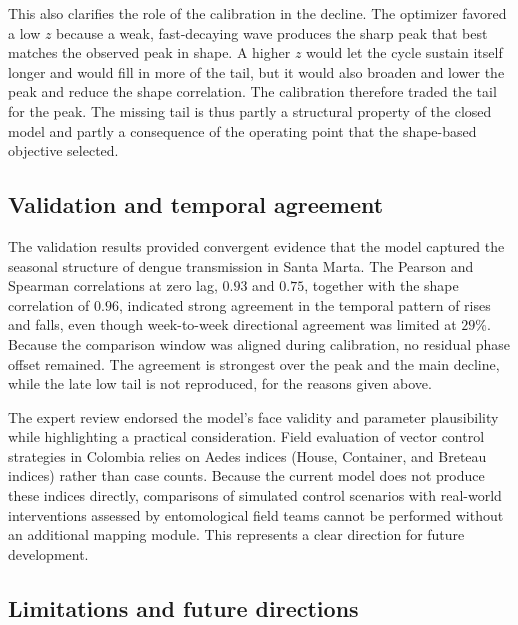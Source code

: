 \documentclass[applsci,article,accept,pdftex,moreauthors]{Definitions/mdpi}
\begin{document}
This also clarifies the role of the calibration in the decline. The optimizer favored a low $z$ because a weak, fast-decaying wave produces the sharp peak that best matches the observed peak in shape. A higher $z$ would let the cycle sustain itself longer and would fill in more of the tail, but it would also broaden and lower the peak and reduce the shape correlation. The calibration therefore traded the tail for the peak. The missing tail is thus partly a structural property of the closed model and partly a consequence of the operating point that the shape-based objective selected.

\subsection{Validation and temporal agreement}

The validation results provided convergent evidence that the model captured the seasonal structure of dengue transmission in Santa Marta. The Pearson and Spearman correlations at zero lag, $0.93$ and $0.75$, together with the shape correlation of $0.96$, indicated strong agreement in the temporal pattern of rises and falls, even though week-to-week directional agreement was limited at $29\%$. Because the comparison window was aligned during calibration, no residual phase offset remained. The agreement is strongest over the peak and the main decline, while the late low tail is not reproduced, for the reasons given above.

The expert review endorsed the model's face validity and parameter plausibility while highlighting a practical consideration. Field evaluation of vector control strategies in Colombia relies on Aedes indices (House, Container, and Breteau indices) rather than case counts. Because the current model does not produce these indices directly, comparisons of simulated control scenarios with real-world interventions assessed by entomological field teams cannot be performed without an additional mapping module. This represents a clear direction for future development.

\subsection{Limitations and future directions}
\end{document}
